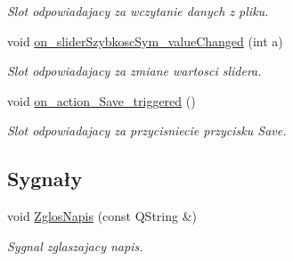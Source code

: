 \begin{DoxyCompactItemize}
\begin{DoxyCompactList}\small\item\em Slot odpowiadajacy za wczytanie danych z pliku. \end{DoxyCompactList}\item 
void \hyperlink{class_okno_glowne_a726ce3fbe89c3fb7364c39e99c0ad658}{on\-\_\-slider\-Szybkosc\-Sym\-\_\-value\-Changed} (int a)
\begin{DoxyCompactList}\small\item\em Slot odpowiadajacy za zmiane wartosci slidera. \end{DoxyCompactList}\item 
void \hyperlink{class_okno_glowne_a8ed8fc49c9c3d3e187639880ce286c88}{on\-\_\-action\-\_\-\-Save\-\_\-triggered} ()
\begin{DoxyCompactList}\small\item\em Slot odpowiadajacy za przycisniecie przycisku Save. \end{DoxyCompactList}\end{DoxyCompactItemize}
\subsection*{Sygnały}
\begin{DoxyCompactItemize}
\item 
void \hyperlink{class_okno_glowne_aa602a0c5a940f0af4ab7390bfc1a4b9d}{Zglos\-Napis} (const Q\-String \&)
\begin{DoxyCompactList}\small\item\em Sygnal zglaszajacy napis. \end{DoxyCompactList}\end{DoxyCompactItemize}
